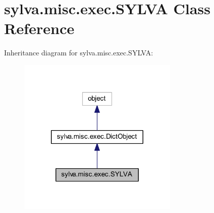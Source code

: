 \hypertarget{classsylva_1_1misc_1_1exec_1_1_s_y_l_v_a}{}\section{sylva.\+misc.\+exec.\+S\+Y\+L\+VA Class Reference}
\label{classsylva_1_1misc_1_1exec_1_1_s_y_l_v_a}


Inheritance diagram for sylva.\+misc.\+exec.\+S\+Y\+L\+VA\+:\nopagebreak
\begin{figure}[H]
\begin{center}
\leavevmode
\includegraphics[width=215pt]{classsylva_1_1misc_1_1exec_1_1_s_y_l_v_a__inherit__graph}
\end{center}
\end{figure}
